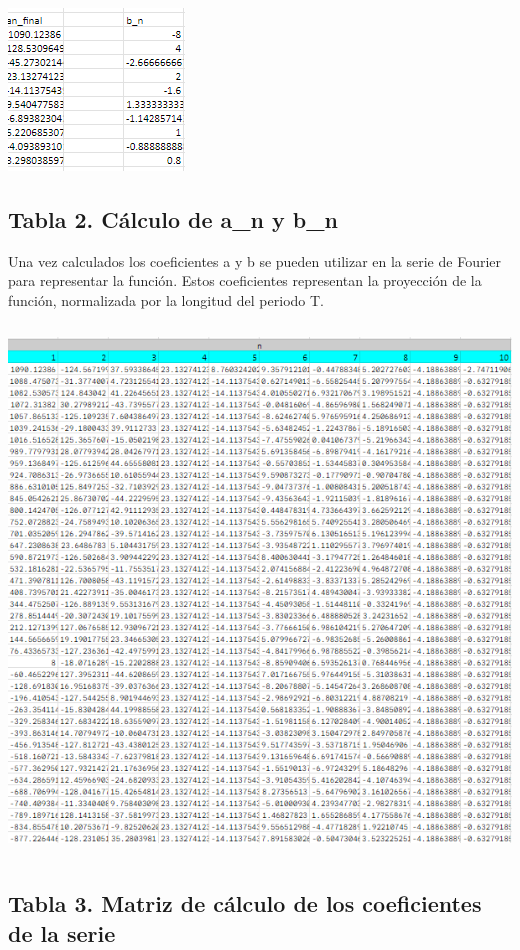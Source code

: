 \includegraphics[width=1.84375in,height=1.69792in]{media/image1.png}

\subsection{Tabla 2. Cálculo de a\_n y b\_n}\label{tabla-2.-cuxe1lculo-de-a_n-y-b_n}

Una vez calculados los coeficientes a y b se pueden utilizar en la serie de Fourier para representar la función. Estos coeficientes representan la proyección de la función, normalizada por la longitud del periodo T.

\includegraphics[width=5.5in,height=5.52745in]{media/image21.png}

\subsection{Tabla 3. Matriz de cálculo de los coeficientes de la serie}\label{tabla-3.-matriz-de-cuxe1lculo-de-los-coeficientes-de-la-serie}


